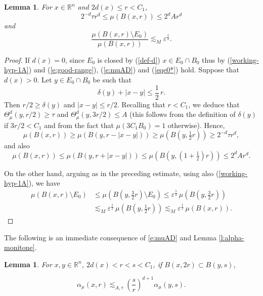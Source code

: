 \documentclass[11pt]{amsart}
\newcommand{\R}{{\mathbb R}}       %
\newcommand{\rf}[1]{{(\ref{#1})}}
\newcommand{\ve}{{\varepsilon}}
\newtheorem{lemma}[theorem]{Lemma}
\theoremstyle{definition}
\theoremstyle{remark}
\numberwithin{equation}{section}
\newcommand{\ps}[1]{\left( #1 \right)}
\def\lec{\lesssim}
\def\lec{\lesssim}
\begin{document}
 
\begin{lemma} 
For $x\in \mathbb{R}^{n}$ and $ 2d(x) \le r< C_{1}$,
\begin{equation}\label{e:muAD}
2^{-d}\tau r^{d}\leq \mu(B(x,r))\leq 2^{d}Ar^{d}
\end{equation}
and
\begin{equation}\label{eqe0*}
\frac{\mu(B(x,r)\setminus E_{0})}{ \mu(B(x,r))}\lesssim_{M}\ve^{\frac{1}{2}}.
\end{equation}
\end{lemma}

\begin{proof} If $d(x)=0$, since $E_0$ is closed by \rf{def-d} $x\in E_0\cap B_0$ thus by \rf{working-hyp-1A} and \rf{e:good-range}, \rf{e:muAD} and \rf{eqe0*} hold.
Suppose that $d(x)>0$.
	Let $y\in E_{0}\cap B_{0}$ be such that 
	\[
	\delta(y) + |x-y|\le \frac{1}2\,r.
\]
	Then $r/2\ge\delta(y)$ and $|x-y|\le r/2$. Recalling that $r<C_1$, we deduce that $\Theta^d_{\mu}(y,r/2)\geq \tau$ and 
	$\Theta^d_{\mu}(y,3r/2)\leq A$ (this follows from the definition of $\delta(y)$ if $3r/2<C_1$ and from
	the fact that $\mu(3C_{1}B_{0})=1$ otherwise). Hence,
\begin{equation}\label{eqe1*}
	\mu(B(x,r))\geq \mu(B(y,r-|x-y|)) \geq \mu(B(y,\tfrac12r))\geq 2^{-d} \tau r^{d},
\end{equation}
	and also
\begin{equation}\label{eqe2*}
	\mu(B(x,r))\leq \mu(B(y,r+|x-y|))\leq  \mu(B(y,(1+\tfrac12)r))\leq 2^{d}Ar^{d}.
\end{equation}

	
On the other hand, arguing as in the preceding estimate, using also  \rf{working-hyp-1A},
we have
\begin{align*}
\mu(B(x,r)\setminus E_0)& \leq  \mu(B(y,\tfrac32r)\setminus E_0)\leq
\ve^\frac{1}{2}\, \mu(B(y,\tfrac32r))\\
&\lesssim_M \ve^\frac{1}{2}\, \mu(B(y,\tfrac12r))
\lesssim_M\ve^\frac{1}{2}\,\mu(B(x,r)).
\end{align*}

			
\end{proof}


The following is an immediate consequence of \eqref{e:muAD} and Lemma \ref{l:alpha-monitone}.

\begin{lemma}\label{a-comparison}
	For $x,y\in \R^{n}$, $2d(x)<r<s<C_{1}$, if $B(x,2r)\subset B(y,s)$,

\begin{equation}\label{e:alpha-monitone}
\alpha_{\mu}(x,r)\lec_{A,\tau} \ps{\frac{s}{r}}^{d+1}\alpha_{\mu}(y,s).
\end{equation}
\end{lemma}
\end{document}
